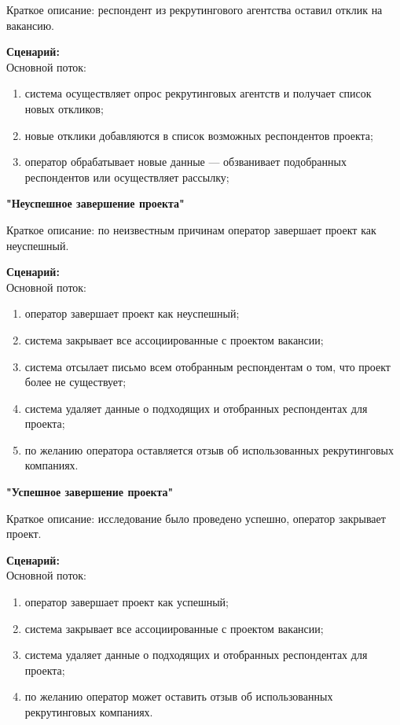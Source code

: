 Краткое описание: респондент из рекрутингового агентства оставил отклик на вакансию.

\textbf{Сценарий:}\\
Основной поток:
\begin{enumerate}
\item система осуществляет опрос рекрутинговых агентств и получает список новых откликов;
\item новые отклики добавляются в список возможных респондентов проекта;
\item оператор обрабатывает новые данные — обзванивает подобранных респондентов или осуществляет рассылку;
\end{enumerate} 

\textbf{"Неуспешное завершение проекта"}

Краткое описание: по неизвестным причинам оператор завершает проект как неуспешный.

\textbf{Сценарий:}\\
Основной поток:
\begin{enumerate}
\item оператор завершает проект как неуспешный;
\item система закрывает все ассоциированные с проектом вакансии;
\item система отсылает письмо всем отобранным респондентам о том, что проект более не существует;
\item система удаляет данные о подходящих и отобранных респондентах для проекта;
\item по желанию оператора оставляется отзыв об использованных рекрутинговых компаниях.
\end{enumerate}

\textbf{"Успешное завершение проекта"}

Краткое описание: исследование было проведено успешно, оператор закрывает проект.

\textbf{Сценарий:}\\
Основной поток:
\begin{enumerate}
\item оператор завершает проект как успешный;
\item система закрывает все ассоциированные с проектом вакансии;
\item система удаляет данные о подходящих и отобранных респондентах для проекта;
\item по желанию оператор может оставить отзыв об использованных рекрутинговых компаниях.
\end{enumerate}

